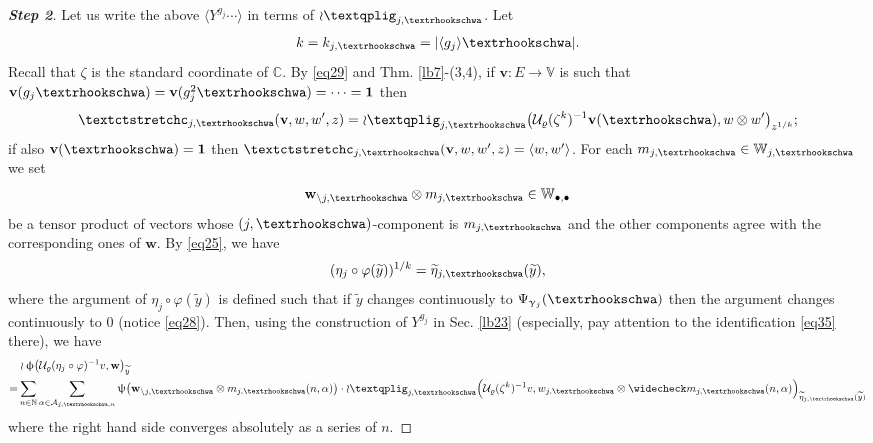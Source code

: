 \documentclass[11pt,b5paper,notitlepage]{article}
\theoremstyle{definition}
\theoremstyle{plain}
\newcommand{\mc}{\mathcal}
\newcommand{\wtd}{\widetilde}
\newcommand{\wch}{\widecheck}
\newcommand{\id}{\mathbf{1}}
\newcommand{\bk}[1]{\langle {#1}\rangle}
\newcommand{\blt}{\bullet}
\newcommand{\Vbb}{\mathbb V}
\newcommand{\Wbb}{\mathbb W}
\newcommand{\Cbb}{\mathbb C}
\newcommand{\Nbb}{\mathbb N}
\newcommand{\vbf}{\mathbf v}
\newcommand{\wbf}{\mathbf w}
\newcommand{\tipae}{\text{\textrhookschwa}}
\newcommand{\tipxcc}{\text{\textctstretchc}}
\newcommand{\tipxphi}{\text{\textqplig}}
\numberwithin{equation}{subsection}
\begin{document}
\begin{proof}[\textbf{Step 2}]
Let us write the above $\bk{Y^{g_j}\cdots}$ in terms of $\wr\tipxphi_{j,\tipae}$. Let
\begin{align*}
	k=k_{j,\tipae}=|\bk{g_j}\tipae|.	
\end{align*}
Recall that $\zeta$ is the standard coordinate of $\Cbb$. By \eqref{eq29} and Thm. \ref{lb7}-(3,4), if $\vbf:E\rightarrow\Vbb$ is such that $\vbf(g_j\tipae)=\vbf(g_j^2\tipae)=\cdots=\id$ then
\begin{align*}
\tipxcc_{j,\tipae}(\vbf,w,w',z)=\wr\tipxphi_{j,\tipae}\big(\mc U_\varrho(\zeta^k)^{-1}\vbf(\tipae),w\otimes w'\big)_{z^{1/k}};	
\end{align*}
if also $\vbf(\tipae)=\id$ then $\tipxcc_{j,\tipae}(\vbf,w,w',z)=\bk{w,w'}$.  For each $m_{j,\tipae}\in\Wbb_{j,\tipae}$ we set
\begin{align*}
\wbf_{\setminus j,\tipae}\otimes m_{j,\tipae}\in\Wbb_{\blt,\blt}	
\end{align*}
be a tensor product of vectors whose $(j,\tipae)$-component is $m_{j,\tipae}$ and the other components agree with the corresponding ones of $\wbf$. By \eqref{eq25}, we have
\begin{align*}
(\eta_j\circ\varphi(\wtd y))^{1/k}=\wtd\eta_{j,\tipae}(\wtd y),
\end{align*}
where the argument of $\eta_j\circ\varphi(\wtd y)$ is defined  such that if $\wtd y$ changes continuously to $\Psi_{\upgamma_j}(\tipae)$ then the argument changes continuously to $0$ (notice \eqref{eq28}). Then, using the construction of  $Y^{g_j}$ in Sec. \ref{lb23} (especially, pay attention to the identification \eqref{eq35} there), we have
\begin{align}
&\wr\upphi\big(\mc U_\varrho(\eta_j\circ\varphi)^{-1}v,\wbf\big)_{\wtd y}\nonumber\\
=&\sum_{n\in\Nbb}\sum_{\alpha\in\mc A_{j,\tipae,n}}\uppsi\big(\wbf_{\setminus j,\tipae}\otimes m_{j,\tipae}(n,\alpha) \big)\cdot \wr\tipxphi_{j,\tipae}\Big(\mc U_\varrho(\zeta^k)^{-1}v,w_{j,\tipae}\otimes\wch m_{j,\tipae}(n,\alpha)\Big)_{\wtd\eta_{j,\tipae}(\wtd y)}\label{eq51}	
\end{align}
where the right hand side converges absolutely as a series of $n$.


\end{proof}
\end{document}
